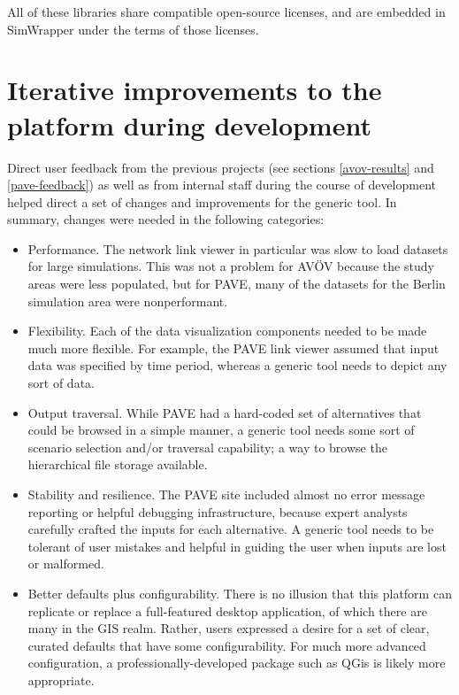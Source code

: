 All of these libraries share compatible open-source licenses, and are embedded in SimWrapper under the terms of those licenses.


\hypertarget{simwrapper-modifications-necessary}{%
\section{Iterative improvements to the platform during development}
\label{simwrapper-modifications-necessary}}

Direct user feedback from the previous projects (see sections \ref{avov-results} and \ref{pave-feedback}) as well as from internal staff during the course of development helped direct a set of changes and improvements for the generic tool. In summary, changes were needed in the following categories:

\begin{itemize}
\item
  Performance. The network link viewer in particular was slow to load
  datasets for large simulations. This was not a problem for AVÖV
  because the study areas were less populated, but for PAVE, many
  of the datasets for the Berlin simulation area were nonperformant.
\item
  Flexibility. Each of the data visualization components needed to be
  made much more flexible. For example, the PAVE link viewer assumed
  that input data was specified by time period, whereas a generic tool
  needs to depict any sort of data.
\item
  Output traversal. While PAVE had a hard-coded set of alternatives that
  could be browsed in a simple manner, a generic tool needs some sort of
  scenario selection and/or traversal capability; a way to browse the
  hierarchical file storage available.
\item
  Stability and resilience. The PAVE site included almost no error
  message reporting or helpful debugging infrastructure, because expert
  analysts carefully crafted the inputs for each alternative. A generic
  tool needs to be tolerant of user mistakes and helpful in guiding the
  user when inputs are lost or malformed.
\item
  Better defaults plus configurability. There is no illusion that this
  platform can replicate or replace a full-featured desktop application,
  of which there are many in the \gls{GIS} realm. Rather, users expressed a
  desire for a set of clear, curated defaults that have some
  configurability. For much more advanced configuration, a
  professionally-developed package such as QGis is likely more appropriate.
\end{itemize}


